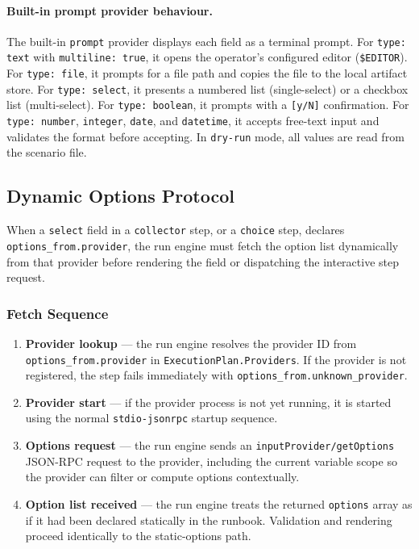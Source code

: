 \paragraph{Built-in prompt provider behaviour.}
The built-in \texttt{prompt} provider displays each field as a terminal prompt.
For \texttt{type: text} with \texttt{multiline: true}, it opens the operator's
configured editor (\texttt{\$EDITOR}).  For \texttt{type: file}, it prompts for
a file path and copies the file to the local artifact store.  For
\texttt{type: select}, it presents a numbered list (single-select) or a
checkbox list (multi-select).  For \texttt{type: boolean}, it prompts with a
\texttt{[y/N]} confirmation.  For \texttt{type: number}, \texttt{integer},
\texttt{date}, and \texttt{datetime}, it accepts free-text input and validates
the format before accepting.  In \texttt{dry-run} mode, all values are read
from the scenario file.

\subsection{Dynamic Options Protocol}
\label{sec:dynamic-options-protocol}

When a \texttt{select} field in a \texttt{collector} step, or a \texttt{choice} step,
declares \texttt{options\_from.provider}, the run engine must fetch the option list
dynamically from that provider before rendering the field or dispatching the interactive
step request.

\subsubsection*{Fetch Sequence}

\begin{enumerate}
  \item \textbf{Provider lookup} — the run engine resolves the provider ID from
        \texttt{options\_from.provider} in \texttt{ExecutionPlan.Providers}.  If the
        provider is not registered, the step fails immediately with
        \texttt{options\_from.unknown\_provider}.
  \item \textbf{Provider start} — if the provider process is not yet running, it is
        started using the normal \texttt{stdio-jsonrpc} startup sequence.
  \item \textbf{Options request} — the run engine sends an
        \texttt{inputProvider/getOptions} JSON-RPC request to the provider, including
        the current variable scope so the provider can filter or compute options
        contextually.
  \item \textbf{Option list received} — the run engine treats the returned
        \texttt{options} array as if it had been declared statically in the runbook.
        Validation and rendering proceed identically to the static-options path.
\end{enumerate}

